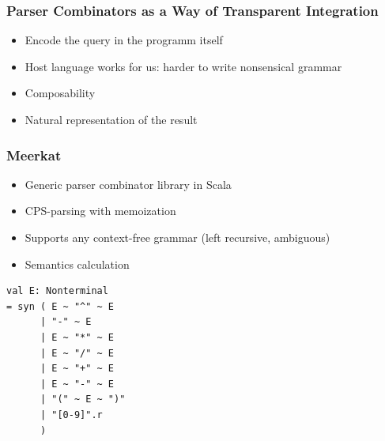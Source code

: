 \documentclass[xcolor=table]{beamer}
\begin{document}
\begin{frame}[fragile]
  \transwipe[direction=90]
  \frametitle{Parser Combinators as a Way of Transparent Integration}
\begin{itemize}
  \item Encode the query in the programm itself
  \item Host language works for us: harder to write nonsensical grammar
  \item Composability 
  \item Natural representation of the result
\end{itemize}
\end{frame}

\begin{frame}[fragile]
  \transwipe[direction=90]
  \frametitle{Meerkat}
\begin{itemize}
  \item Generic parser combinator library in Scala
  \item CPS-parsing with memoization
  \item Supports any context-free grammar (left recursive, ambiguous)
  \item Semantics calculation
\end{itemize}

\begin{lstlisting}
val E: Nonterminal
= syn ( E ~ "^" ~ E
      | "-" ~ E
      | E ~ "*" ~ E 
      | E ~ "/" ~ E 
      | E ~ "+" ~ E 
      | E ~ "-" ~ E
      | "(" ~ E ~ ")"
      | "[0-9]".r 
      )
\end{lstlisting}
\end{frame}
\end{document}
